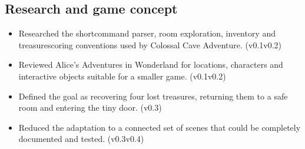 \documentclass[letterpaper,10pt,english]{sphinxmanual}
\begin{document}
\subsection{Research and game concept}
\label{\detokenize{AssignmentFour/main:research-and-game-concept}}\begin{itemize}
\item {} 
\sphinxAtStartPar
Researched the short\sphinxhyphen{}command parser, room exploration, inventory and treasure\sphinxhyphen{}scoring conventions used by Colossal Cave Adventure. (v0.1\sphinxhyphen{}v0.2)

\item {} 
\sphinxAtStartPar
Reviewed Alice’s Adventures in Wonderland for locations, characters and interactive objects suitable for a smaller game. (v0.1\sphinxhyphen{}v0.2)

\item {} 
\sphinxAtStartPar
Defined the goal as recovering four lost treasures, returning them to a safe room and entering the tiny door. (v0.3)

\item {} 
\sphinxAtStartPar
Reduced the adaptation to a connected set of scenes that could be completely documented and tested. (v0.3\sphinxhyphen{}v0.4)

\end{itemize}
\end{document}
